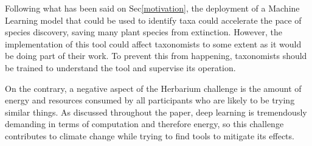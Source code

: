 \documentclass{article}
\begin{document}
Following what has been said on Sec\ref{motivation}, the deployment of a Machine Learning model that could be used to identify taxa could accelerate the pace of species discovery, saving many plant species from extinction. However, the implementation of this tool could affect taxonomists to some extent as it would be doing part of their work. To prevent this from happening, taxonomists should be trained to understand the tool and supervise its operation.

On the contrary, a negative aspect of the Herbarium challenge is the amount of energy and resources consumed by all participants who are likely to be trying similar things. As discussed throughout the paper, deep learning is tremendously demanding in terms of computation and therefore energy, so this challenge contributes to climate change while trying to find tools to mitigate its effects.


\medskip

\small


\end{document}
